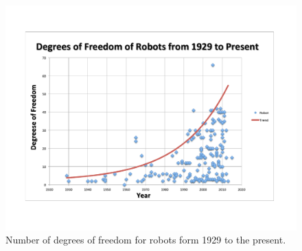 \begin{figure}[thpb]
  \centering
      \includegraphics[width=0.8\columnwidth]{./pix/robotsDOF.pdf}
\caption{Number of degrees of freedom for robots form 1929 to the present.}
\label{fig:numOfRobots}
\end{figure}

